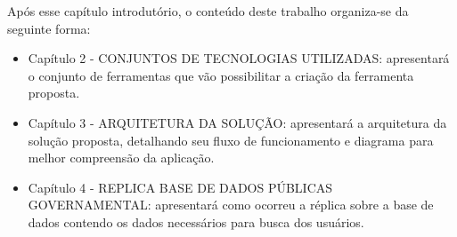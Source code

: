Após esse capítulo introdutório, o conteúdo deste trabalho organiza-se da seguinte forma:
	\begin{itemize}
		\item{Capítulo 2 - \uppercase{Conjuntos de tecnologias utilizadas}: apresentará o conjunto de ferramentas que vão possibilitar a criação da ferramenta proposta.}
		\item{Capítulo 3 - \uppercase{Arquitetura da solução}: apresentará a arquitetura da solução proposta, detalhando seu fluxo de funcionamento e diagrama para melhor compreensão da aplicação.}
		\item{Capítulo 4 - \uppercase{Replica base de dados públicas governamental}: apresentará como ocorreu a réplica sobre a base de dados contendo os dados necessários para busca dos usuários.}
	\end{itemize}
